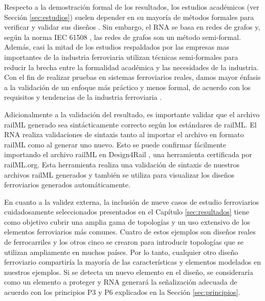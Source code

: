     Respecto a la demostración formal de los resultados, los estudios académicos (ver Sección \ref{sec:estudios}) suelen depender en su mayoría de métodos formales para verificar y validar sus diseños \cite{Paper_184,Paper_144,Paper_87,Paper_186,Paper_187,Paper_188,Paper_89,Paper_141,Paper_161,Paper_164,Paper_165,Paper_171,Paper_189}. Sin embargo, el RNA se basa en redes de grafos y, según la norma IEC 61508 \cite{Paper_77,Paper_78,Paper_79,Paper_80,Paper_81,Paper_82,Paper_83}, las redes de grafos son un método semi-formal. Además, casi la mitad de los estudios respaldados por las empresas mas importantes de la industria ferroviaria utilizan técnicas semi-formales \cite{Paper_88,Paper_94,Paper_95,Paper_123,Paper_196} para reducir la brecha entre la formalidad académica y las necesidades de la industria. Con el fin de realizar pruebas en sistemas ferroviarios reales, damos mayor énfasis a la validación de un enfoque más práctico y menos formal, de acuerdo con los requisitos y tendencias de la industria ferroviaria \cite{Paper_70,Paper_71,Paper_72,Paper_73,Paper_74,Paper_75,Paper_76,Paper_77,Paper_84}.
    
    Adicionalmente a la validación del resultado, es importante validar que el archivo railML generado sea sintácticamente correcto según los estándares de railML. El RNA realiza validaciones de sintaxis tanto al importar el archivo en formato railML como al generar uno nuevo. Esto se puede confirmar fácilmente importando el archivo railML en Design4Rail \cite{DESIGN4RAIL}, una herramienta certificada por railML.org. Esta herramienta realiza una validación de sintaxis de nuestros archivos railML generados y también se utiliza para visualizar los diseños ferroviarios generados automáticamente.

    En cuanto a la validez externa, la inclusión de nueve casos de estudio ferroviarios cuidadosamente seleccionados presentados en el Capítulo \ref{sec:resultados} tiene como objetivo cubrir una amplia gama de topologías y un uso extensivo de los elementos ferroviarios más comunes. Cuatro de estos ejemplos son diseños reales de ferrocarriles y los otros cinco se crearon para introducir topologías que se utilizan ampliamente en muchos países. Por lo tanto, cualquier otro diseño ferroviario compartiría la mayoría de las características y elementos modelados en nuestros ejemplos. Si se detecta un nuevo elemento en el diseño, se consideraría como un elemento a proteger y RNA generará la señalización adecuada de acuerdo con los principios P3 y P6 explicados en la Sección \ref{sec:principios}.

